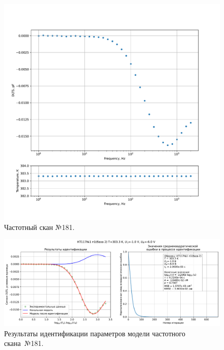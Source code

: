 \begin{figure}[!ht]
    \centering
    \includegraphics[width=1\textwidth]{../plots/КТ117№1_п1(база 2)_2500Гц-1Гц_1пФ_+30С_-1В-6В_200мВ_20мкс_шаг_0,1.pdf}
    \caption{Частотный скан №181.}
    \label{pic:frequency_scan_181}
\end{figure}

\begin{figure}[!ht]
    \centering
    \includegraphics[width=1\textwidth]{../plots/КТ117№1_п1(база 2)_2500Гц-1Гц_1пФ_+30С_-1В-6В_200мВ_20мкс_шаг_0,1_model.pdf}
    \caption{Результаты идентификации параметров модели частотного скана~№181.}
    \label{pic:frequency_scan_model181}
\end{figure}

\pagebreak


